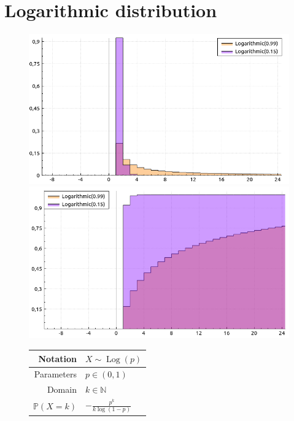 \documentclass[a4paper,11pt]{article}
\theoremstyle{plain}
\theoremstyle{definition}
\newcommand{\MP}{\mathbb{P}}
\newcommand{\MN}{\mathbb{N}}
\begin{document}
   	\section{Logarithmic distribution}
   	\begin{figure}[!htb]\centering
   		\begin{minipage}{0.55\textwidth}
   			\includegraphics[width=\linewidth, right]{logarithmic_pmf}
   			\captionsetup{labelformat=empty}
   			\includegraphics[width=\linewidth, right]{logarithmic_cdf}
   			\captionsetup{labelformat=empty}
   		\end{minipage}
   		\begin{minipage}{0.4\textwidth}
   			\begin{tabular}{| r | l |}
   				\hline
   				Notation & $ X \sim \operatorname{Log}(p) $\\
   				\hline
   				Parameters & $p \in (0, 1)$ \\
   				\hline
   				Domain & $ k \in \MN $  \\
   				\hline
   				$\MP(X = k)$ & $  -\frac{p^k}{k \log(1-p)}   $ \\

\end{tabular}
\end{minipage}
\end{figure}
\end{document}
